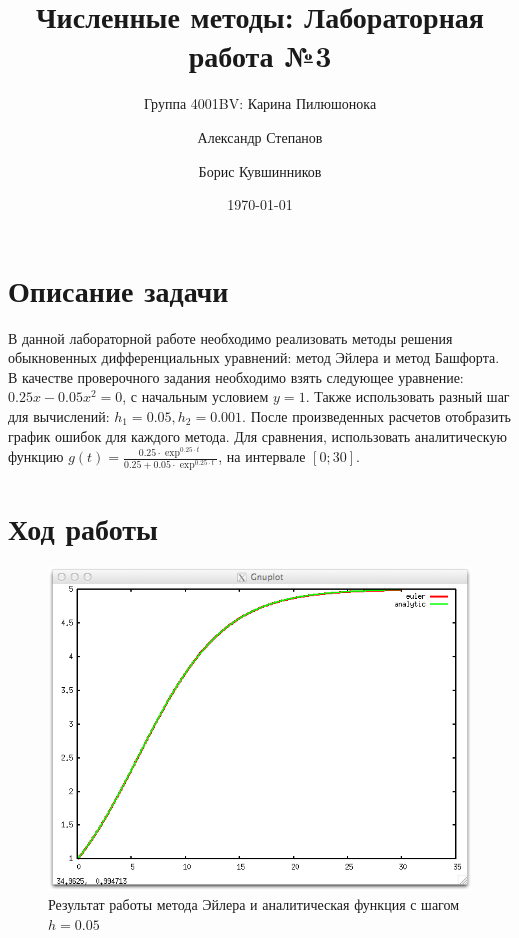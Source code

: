 \documentclass{article}
\title{Численные методы: Лабораторная работа №3}
\author{Группа 4001BV: Карина Пилюшонока \and Александр Степанов \and Борис
Кувшинников} \date \today
\begin{document}
\maketitle
\newpage
\tableofcontents
\newpage
\section{Описание задачи}
В данной лабораторной работе необходимо реализовать методы решения
обыкновенных дифференциальных уравнений: метод Эйлера и метод Башфорта.
В качестве проверочного задания необходимо взять следующее уравнение: 
$0.25x - 0.05x^2 = 0$, с начальным условием $y = 1$. Также использовать разный
шаг для вычислений: $h_1 = 0.05, h_2=0.001$. После произведенных расчетов
отобразить график ошибок для каждого метода. Для сравнения, использовать
аналитическую функцию $g(t) = \frac{0.25 \cdot \exp^{0.25
\cdot t}}{0.25 + 0.05 \cdot \exp^{0.25 \cdot t}}$, на интервале $[0; 30]$.

\section{Ход работы}

  \begin{figure}[h!]
    \includegraphics[width=13cm]{eulerVSanalytic005.png}
    \caption{Результат работы метода Эйлера и аналитическая функция с шагом
    $h=0.05$}
    \label{eulerVSanalytic}
  \end{figure}
  
\end{document}
